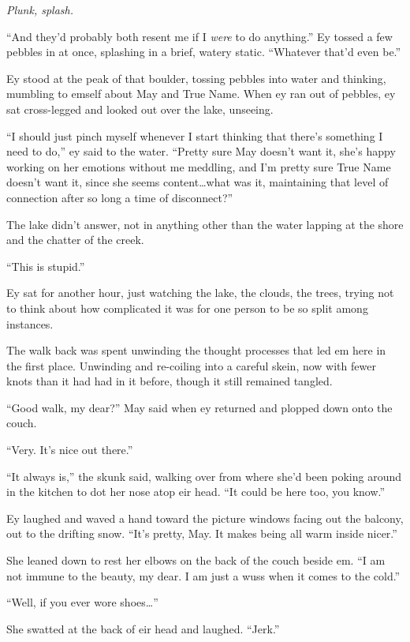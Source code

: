 \emph{Plunk, splash.}

``And they'd probably both resent me if I \emph{were} to do anything.'' Ey tossed a few pebbles in at once, splashing in a brief, watery static. ``Whatever that'd even be.''

Ey stood at the peak of that boulder, tossing pebbles into water and thinking, mumbling to emself about May and True Name. When ey ran out of pebbles, ey sat cross-legged and looked out over the lake, unseeing.

``I should just pinch myself whenever I start thinking that there's something I need to do,'' ey said to the water. ``Pretty sure May doesn't want it, she's happy working on her emotions without me meddling, and I'm pretty sure True Name doesn't want it, since she seems content\ldots what was it, maintaining that level of connection after so long a time of disconnect?''

The lake didn't answer, not in anything other than the water lapping at the shore and the chatter of the creek.

``This is stupid.''

Ey sat for another hour, just watching the lake, the clouds, the trees, trying not to think about how complicated it was for one person to be so split among instances.

The walk back was spent unwinding the thought processes that led em here in the first place. Unwinding and re-coiling into a careful skein, now with fewer knots than it had had in it before, though it still remained tangled.

``Good walk, my dear?'' May said when ey returned and plopped down onto the couch.

``Very. It's nice out there.''

``It always is,'' the skunk said, walking over from where she'd been poking around in the kitchen to dot her nose atop eir head. ``It could be here too, you know.''

Ey laughed and waved a hand toward the picture windows facing out the balcony, out to the drifting snow. ``It's pretty, May. It makes being all warm inside nicer.''

She leaned down to rest her elbows on the back of the couch beside em. ``I am not immune to the beauty, my dear. I am just a wuss when it comes to the cold.''

``Well, if you ever wore shoes\ldots{}''

She swatted at the back of eir head and laughed. ``Jerk.''

